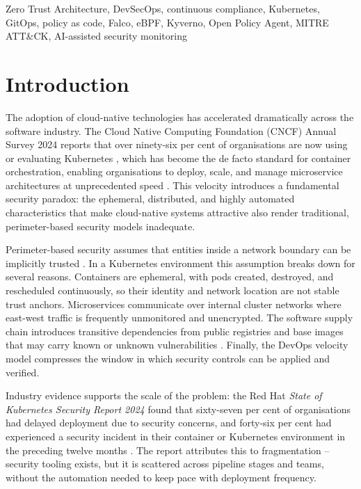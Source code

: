 \documentclass[conference]{IEEEtran}
\begin{document}
\begin{IEEEkeywords}
Zero Trust Architecture, DevSecOps, continuous compliance, Kubernetes, GitOps, policy as code, Falco, eBPF, Kyverno, Open Policy Agent, MITRE ATT\&CK, AI-assisted security monitoring
\end{IEEEkeywords}

\section{Introduction}

The adoption of cloud-native technologies has accelerated dramatically across the software industry. The Cloud Native Computing Foundation (CNCF) Annual Survey 2024 reports that over ninety-six per cent of organisations are now using or evaluating Kubernetes \cite{cncf2024}, which has become the de facto standard for container orchestration, enabling organisations to deploy, scale, and manage microservice architectures at unprecedented speed \cite{burns2016}. This velocity introduces a fundamental security paradox: the ephemeral, distributed, and highly automated characteristics that make cloud-native systems attractive also render traditional, perimeter-based security models inadequate.

Perimeter-based security assumes that entities inside a network boundary can be implicitly trusted \cite{kindervag2010}. In a Kubernetes environment this assumption breaks down for several reasons. Containers are ephemeral, with pods created, destroyed, and rescheduled continuously, so their identity and network location are not stable trust anchors. Microservices communicate over internal cluster networks where east-west traffic is frequently unmonitored and unencrypted. The software supply chain introduces transitive dependencies from public registries and base images that may carry known or unknown vulnerabilities \cite{sonatype2023}. Finally, the DevOps velocity model compresses the window in which security controls can be applied and verified.

Industry evidence supports the scale of the problem: the Red Hat \emph{State of Kubernetes Security Report 2024} found that sixty-seven per cent of organisations had delayed deployment due to security concerns, and forty-six per cent had experienced a security incident in their container or Kubernetes environment in the preceding twelve months \cite{redhat2024}. The report attributes this to fragmentation -- security tooling exists, but it is scattered across pipeline stages and teams, without the automation needed to keep pace with deployment frequency.
\end{document}
